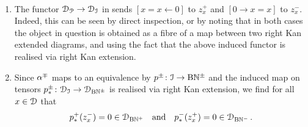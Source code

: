 \begin{remarks}\
\label{remark:cofree}%
\begin{enumerate}
	\item The functor $\mathcal{D}_{\mathcal{P}} \to \mathcal{D}_{\mathcal{I}}$ in  sends $[x = x \leftarrow 0]$ to $z^+_x$ and $[0 \rightarrow x = x]$ to $z^-_x$. Indeed, this can be seen by direct inspection, or by noting that in both cases the object in question is obtained as a fibre of a map between two right Kan extended diagrams, and using the fact that the above induced functor is realised via right Kan extension.
	\item Since $\alpha^{\mp}$ maps to an equivalence by $p^{\pm}\colon \mathcal{I} \to \mathrm{B}\mathbb{N}^{\pm}$ %
and the induced map on tensors $p^{\pm}_*\colon \mathcal{D}_{\mathcal{I}} \to \mathcal{D}_{\mathrm{B}\mathbb{N}^{\pm}}$ is realised via right Kan extension, we find for all $x \in \mathcal{D}$ that 
\[
p^+_*(z_x^-) = 0 \in \mathcal{D}_{\mathrm{B}\mathbb{N}^+} \quad\text{and}\quad p^-_*(z^+_x) = 0 \in \mathcal{D}_{\mathrm{B}\mathbb{N}^-} \, .
\]
\end{enumerate}
\end{remarks}



